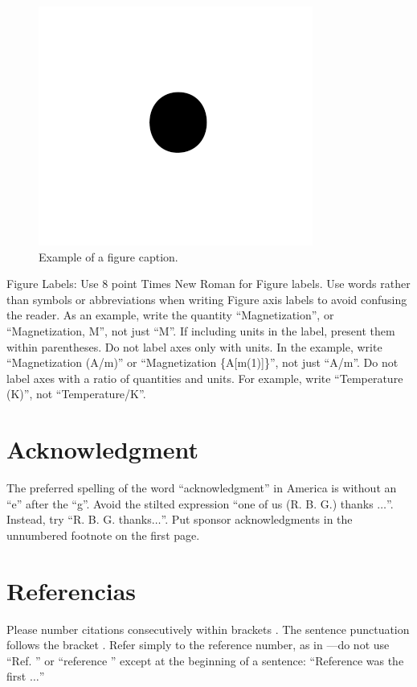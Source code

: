 \documentclass[conference]{IEEEtran}
\begin{document}
\begin{figure}[htbp]
\centerline{\includegraphics{fig1.png}}
\caption{Example of a figure caption.}
\label{fig}
\end{figure}

Figure Labels: Use 8 point Times New Roman for Figure labels. Use words 
rather than symbols or abbreviations when writing Figure axis labels to 
avoid confusing the reader. As an example, write the quantity 
``Magnetization'', or ``Magnetization, M'', not just ``M''. If including 
units in the label, present them within parentheses. Do not label axes only 
with units. In the example, write ``Magnetization (A/m)'' or ``Magnetization 
\{A[m(1)]\}'', not just ``A/m''. Do not label axes with a ratio of 
quantities and units. For example, write ``Temperature (K)'', not 
``Temperature/K''.

\section*{Acknowledgment}

The preferred spelling of the word ``acknowledgment'' in America is without 
an ``e'' after the ``g''. Avoid the stilted expression ``one of us (R. B. 
G.) thanks $\ldots$''. Instead, try ``R. B. G. thanks$\ldots$''. Put sponsor 
acknowledgments in the unnumbered footnote on the first page.

\section*{Referencias}

Please number citations consecutively within brackets \cite{b1}. The 
sentence punctuation follows the bracket \cite{b2}. Refer simply to the reference 
number, as in \cite{b3}---do not use ``Ref. \cite{b3}'' or ``reference \cite{b3}'' except at 
the beginning of a sentence: ``Reference \cite{b3} was the first $\ldots$''
\end{document}
